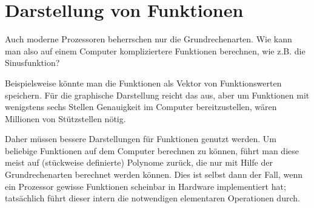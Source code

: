 % 

\chapter{Darstellung von Funktionen}

Auch moderne Prozessoren beherrschen nur die Grundrechenarten. Wie
kann man also auf einem Computer kompliziertere Funktionen berechnen,
wie z.B. die Sinusfunktion?

Beispielsweise könnte man die Funktionen als Vektor von
Funktionswerten speichern. Für die graphische Darstellung reicht das
aus, aber um Funktionen mit wenigstens sechs Stellen Genauigkeit im
Computer bereitzustellen, wären Millionen von Stützstellen nötig.

Daher müssen bessere Darstellungen für Funktionen genutzt werden.  Um
beliebige Funktionen auf dem Computer berechnen zu können, führt man
diese meist auf (stückweise definierte) Polynome zurück, die nur mit
Hilfe der Grundrechenarten berechnet werden können. Dies ist selbst
dann der Fall, wenn ein Prozessor gewisse Funktionen scheinbar in
Hardware implementiert hat; tatsächlich führt dieser intern die
notwendigen elementaren Operationen durch.

\section{}
\label{sec:horner}

